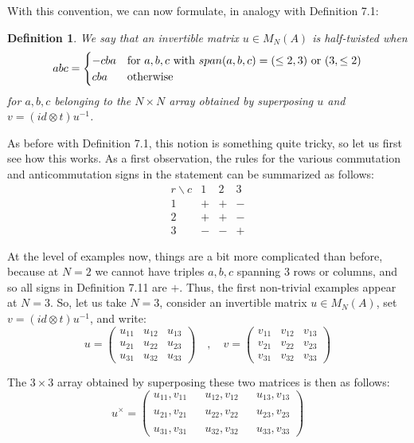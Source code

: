 \documentclass[12pt]{amsbook}
\newtheorem{definition}[theorem]{Definition}
\begin{document}
With this convention, we can now formulate, in analogy with Definition 7.1:

\begin{definition}
We say that an invertible matrix $u\in M_N(A)$ is half-twisted when
$$abc=\begin{cases}
-cba&{\rm for}\ a,b,c\ {\rm with}\ span(a,b,c)=(\leq 2,3)\ {\rm or}\ (3,\leq 2)\\
cba&{\rm otherwise}
\end{cases}$$
for $a,b,c$ belonging to the $N\times N$ array obtained by superposing $u$ and $v=(id\otimes t)u^{-1}$.
\end{definition}

As before with Definition 7.1, this notion is something quite tricky, so let us first see how this works. As a first observation, the rules for the various commutation and anticommutation signs in the statement can be summarized as follows:
$$\begin{matrix}
r\backslash c&1&2&3\\
1&+&+&-\\
2&+&+&-\\
3&-&-&+
\end{matrix}$$

At the level of examples now, things are a bit more complicated than before, because at $N=2$ we cannot have triples $a,b,c$ spanning 3 rows or columns, and so all signs in Definition 7.11 are $+$. Thus, the first non-trivial examples appear at $N=3$. So, let us take $N=3$, consider an invertible matrix $u\in M_N(A)$, set $v=(id\otimes t)u^{-1}$, and write:
$$u=\begin{pmatrix}u_{11}&u_{12}&u_{13}\\ u_{21}&u_{22}&u_{23}\\ u_{31}&u_{32}&u_{33}\end{pmatrix}
\quad,\quad 
v=\begin{pmatrix}v_{11}&v_{12}&v_{13}\\ v_{21}&v_{22}&v_{23}\\ v_{31}&v_{32}&v_{33}\end{pmatrix}$$

The $3\times3$ array obtained by superposing these two matrices is then as follows:
$$u^\times=\begin{pmatrix}u_{11},v_{11}&&u_{12},v_{12}&&u_{13},v_{13}\\ 
\\
u_{21},v_{21}&&u_{22},v_{22}&&u_{23},v_{23}\\
\\
u_{31},v_{31}&&u_{32},v_{32}&&u_{33},v_{33}
\end{pmatrix}$$
\end{document}
